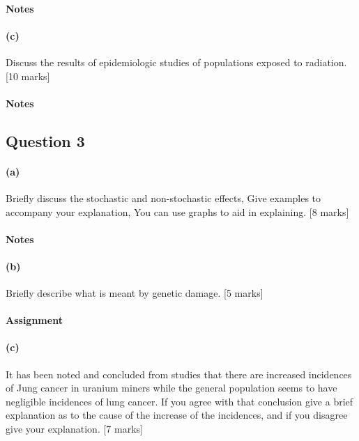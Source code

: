 \documentclass[a4paper,twoside,11pt]{article}
\begin{document}
\paragraph{Notes}

\paragraph{(c)}Discuss the results of epidemiologic studies of populations exposed to radiation. [10 marks]

\paragraph{Notes}

\newpage
\subsection*{Question 3}

\paragraph{(a)}Briefly discuss the stochastic and non-stochastic effects, Give examples to accompany your explanation, You can use graphs to aid in explaining. [8 marks]

\paragraph{Notes}

\paragraph{(b)}Briefly describe what is meant by genetic damage. [5 marks]

\paragraph{Assignment}

\paragraph{(c)}It has been noted and concluded from studies that there are increased incidences of Jung cancer in uranium miners while the general population seems to have negligible incidences of lung cancer. If you agree with that conclusion give a brief explanation as to the cause of the increase of the incidences, and if you disagree give your explanation. [7 marks]
\end{document}
